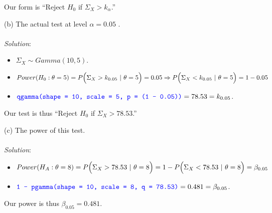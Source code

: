 \documentclass[12pt]{article}
\newcommand{\XBB}{\color{blue}}
\newcommand{\ds}{\displaystyle}
\begin{document}
\noindent
Our form is ``Reject $ H_{0} $ if $ \Sigma_{X} > k_{\alpha} $.''

\vspace{2.5mm}

(b) The actual test at level $ \alpha = 0.05$ . \\
\vspace{2.5mm} \\
\textit{Solution}:
\vspace{2.5mm} \\

\begin{itemize}
    \item $ \ds \Sigma_{X} \sim Gamma(10, 5) $.
    \item $ \ds Power(H_{0} : \theta = 5) = P \Bigl(\Sigma_{X} > k_{0.05} \ | \ \theta = 5 \Bigr) = 0.05 \Rightarrow P \Bigl(\Sigma_{X} < k_{0.05} \ | \ \theta = 5 \Bigr) = 1 - 0.05 $
    \item $ \ds {\XBB \texttt{qgamma(shape = 10, scale = 5, p = (1 - 0.05))}} = 78.53 = k_{0.05} $.
\end{itemize}

\noindent
Our test is thus ``Reject $ H_{0} $ if $ \Sigma_{X} > 78.53 $.'' \\

\vspace{2.5mm}

\newpage

(c) The power of this test. \\
\vspace{2.5mm} \\
\textit{Solution}:
\vspace{2.5mm} \\

\begin{itemize}
    \item $ \ds Power(H_{A} : \theta = 8) = P \Bigl(\Sigma_{X} > 78.53 \ | \ \theta = 8 \Bigr) = 1 - P \Bigl(\Sigma_{X} < 78.53 \ | \ \theta = 8 \Bigr) = \beta_{0.05} $
    \item $ \ds {\XBB \texttt{1 - pgamma(shape = 10, scale = 8, q = 78.53)}} = 0.481 = \beta_{0.05} $.
\end{itemize}

\noindent
Our power is thus $ \beta_{0.05} = 0.481 $. \\
\end{document}
